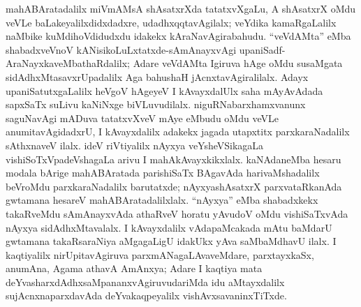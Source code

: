 mahABAratadalilx miVmAMsA shAsatxrXda tatatxvXgaLu, A shAsatxrX oMdu veVLe baLake\-yalilxdidxdadxre, udadhxqqtavAgilalx; veYdika kamaRgaLalilx naMbike kuMdihoVdidudxdu idakekx kAraNavAgirabahudu. ``veVdAMta'' eMba shabadxveVnoV kANisikoLuLxtatxde-sAmAnayx\-vAgi upaniSadf-AraNayxkaveMbathaRdalilx; Adare veVdAMta Igiruva hAge oMdu susaMgata sidAdhxMtasavxrUpadalilx Aga bahushaH jAcnxtavAgiralilalx. Adayx upaniSatutxgaLalilx heVgoV hAgeyeV I kAvayxdalUlx saha mAyAvAdada sapxSaTx suLivu kaNiNxge biVLuvudilalx. niguRNabarxhamxvanunx saguNavAgi mADuva tatatxvXveV mAye eMbudu oMdu veVLe anumitavAgidadxrU, I kAvayxdalilx adakekx jagada utapxtitx parxkaraNadalilx sAthxnaveV ilalx. ideV riVtiyalilx nAyxya veYsheVSikagaLa vishiSoTxVpadeVshagaLa arivu I mahAkAvayxkikxlalx. kaNAdaneMba hesaru modala bArige mahABAratada parishiSaTx BAgavAda harivaMshadalilx beVroMdu parxkaraNadalilx barutatxde; nAyxyashAsatxrX parxvataRkanAda gwtamana hesareV mahABAratadalilxlalx. ``nAyxya'' eMba shabadxkekx takaRveMdu sAmAnayxvAda athaRveV horatu yAvudoV oMdu vishiSaTxvAda nAyxya sidAdhxMtavalalx. I kAvayxdalilx vAdapaMcakada mAtu baMdarU  gwtamana takaRsaraNiya aMgagaLigU  idakUkx yAva saMbaMdhavU ilalx. I kaqtiyalilx nirUpitavAgiruva parxmANagaLAvaveMdare, parxtayxkaSx, anumAna, Agama athavA AmAnxya; Adare I kaqtiya mata deYvasharxdAdhxsaMpananxvAgiruvudariMda idu aMtayxdalilx sujAcnxnaparxdavAda deYvakaqpeyalilx vishAvxsavaninxTiTxde.

